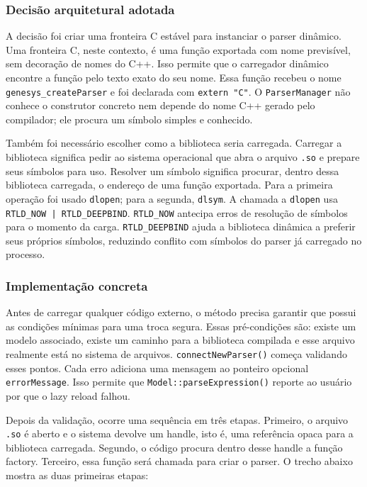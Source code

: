 \documentclass[12pt,a4paper]{article}
\begin{document}
\subsubsection{Decis\~ao arquitetural adotada}

A decis\~ao foi criar uma fronteira C est\'avel para instanciar o parser din\^amico. Uma fronteira C, neste contexto, \'e uma fun\c{c}\~ao exportada com nome previs\'ivel, sem decora\c{c}\~ao de nomes do C++. Isso permite que o carregador din\^amico encontre a fun\c{c}\~ao pelo texto exato do seu nome. Essa fun\c{c}\~ao recebeu o nome \texttt{genesys\_createParser} e foi declarada com \texttt{extern "C"}. O \texttt{ParserManager} n\~ao conhece o construtor concreto nem depende do nome C++ gerado pelo compilador; ele procura um s\'imbolo simples e conhecido.

Tamb\'em foi necess\'ario escolher como a biblioteca seria carregada. Carregar a biblioteca significa pedir ao sistema operacional que abra o arquivo \texttt{.so} e prepare seus s\'imbolos para uso. Resolver um s\'imbolo significa procurar, dentro dessa biblioteca carregada, o endere\c{c}o de uma fun\c{c}\~ao exportada. Para a primeira opera\c{c}\~ao foi usado \texttt{dlopen}; para a segunda, \texttt{dlsym}. A chamada a \texttt{dlopen} usa \texttt{RTLD\_NOW | RTLD\_DEEPBIND}. \texttt{RTLD\_NOW} antecipa erros de resolu\c{c}\~ao de s\'imbolos para o momento da carga. \texttt{RTLD\_DEEPBIND} ajuda a biblioteca din\^amica a preferir seus pr\'oprios s\'imbolos, reduzindo conflito com s\'imbolos do parser j\'a carregado no processo.

\subsubsection{Implementa\c{c}\~ao concreta}

Antes de carregar qualquer c\'odigo externo, o m\'etodo precisa garantir que possui as condi\c{c}\~oes m\'inimas para uma troca segura. Essas pr\'e-condi\c{c}\~oes s\~ao: existe um modelo associado, existe um caminho para a biblioteca compilada e esse arquivo realmente est\'a no sistema de arquivos. \texttt{connectNewParser()} come\c{c}a validando esses pontos. Cada erro adiciona uma mensagem ao ponteiro opcional \texttt{errorMessage}. Isso permite que \texttt{Model::parseExpression()} reporte ao usu\'ario por que o lazy reload falhou.

Depois da valida\c{c}\~ao, ocorre uma sequ\^encia em tr\^es etapas. Primeiro, o arquivo \texttt{.so} \'e aberto e o sistema devolve um handle, isto \'e, uma refer\^encia opaca para a biblioteca carregada. Segundo, o c\'odigo procura dentro desse handle a fun\c{c}\~ao factory. Terceiro, essa fun\c{c}\~ao ser\'a chamada para criar o parser. O trecho abaixo mostra as duas primeiras etapas:
\end{document}
